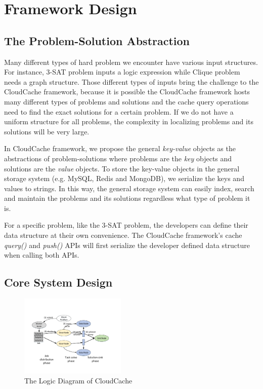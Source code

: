\section{Framework Design}\label{sec:design}
\subsection{The Problem-Solution Abstraction}
Many different types of hard problem we encounter have various input structures. For instance, 3-SAT problem inputs a logic expression while Clique problem needs a graph structure. Those different types of inputs bring the challenge to the CloudCache framework, because it is possible the CloudCache framework hosts many different types of problems and solutions and the cache query operations need to find the exact solutions for a certain problem. If we do not have a uniform structure for all problems, the complexity in localizing problems and its solutions will be very large.

In CloudCache framework, we propose the general \emph{key-value} objects as the abstractions of problem-solutions where problems are the \emph{key} objects and solutions are the \emph{value} objects. To store the key-value objects in the general storage system (e.g. MySQL, Redis and MongoDB), we serialize the keys and values to strings. In this way, the general storage system can easily index, search and maintain the problems and its solutions regardless what type of problem it is.

For a specific problem, like the 3-SAT problem, the developers can define their data structure at their own convenience. The CloudCache framework's cache \emph{query()} and \emph{push()} APIs will first serialize the developer defined data structure when calling both APIs.

\subsection{Core System Design}
\begin{figure}
\centering
\includegraphics[width=0.45\textwidth]{pics/workflow.pdf}
\caption{The Logic Diagram of CloudCache}
\label{fig:logic}
\end{figure}

